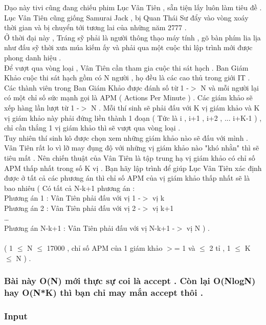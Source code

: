 



   Dạo này tivi cũng đang chiếu phim Lục Vân Tiên , sẵn tiện lấy luôn làm tiêu đề .   
\\   Lục Vân Tiên cũng giống Samurai Jack , bị Quan Thái Sư đẩy vào vòng xoáy thời gian và bị chuyển tới tương lai của những năm 2777 .   
\\   Ở thời đại này , Tráng sỹ phải là người thông thạo máy tính , gõ bàn phím lia lịa như đấu sỹ thời xưa múa kiếm ấy và phải qua một cuộc thi lập trình mới được phong danh hiệu .   
\\   Để vượt qua vòng loại , Vân Tiên cần tham gia cuộc thi sát hạch . Ban Giám Khảo cuộc thi sát hạch gồm có N người , họ đều là các cao thủ trong giới IT . Các thành viên trong Ban Giám Khảo được đánh số từ 1 -$>$ N và mỗi người lại có một chỉ số sức mạnh gọi là APM ( Actions Per Minute ) . Các giám khảo sẽ xếp hàng lần lượt từ 1 -$>$ N . Mỗi thí sinh sẽ phải đấu với K vị giám khảo và K vị giám khảo này phải đứng liền thành 1 đoạn ( Tức là i , i+1 , i+2 , ... i+K-1 ) , chỉ cần thắng 1 vị giám khảo thì sẽ vượt qua vòng loại .   
\\   Tuy nhiên thí sinh kô được chọn xem những giám khảo nào sẽ đấu với mình .   
\\   Vân Tiên rất lo vì lỡ may đụng độ với những vị giám khảo nào "khó nhằn" thì sẽ tiêu mất . Nên chiến thuật của Vân Tiên là tập trung hạ vị giám khảo có chỉ số APM thấp nhất trong số K vị . Bạn hãy lập trình để giúp Lục Vân Tiên xác định được ở tất cả các phương án thì chỉ số APM của vị giám khảo thấp nhất sẽ là bao nhiêu ( Có tất cả N-k+1 phương án :   
\\   Phương án 1 : Vân Tiên phải đấu với vị 1 -$>$ vị k   
\\   Phương án 2 : Vân Tiên phải đấu với vị 2 -$>$ vị k+1   
\\   …   
\\   Phương án N-k+1  : Vân Tiên phải đấu với vị N-k+1 -$>$ vị N ) .   
\\
\\   ( 1  $\le$  N  $\le$  17000 , chỉ số APM của 1 giám khảo $>$= 1 và  $\le$  2 tỉ , 1  $\le$  K  $\le$  N ) .  

\subsubsection{   Bài này O(N) mới thực sự coi là accept . Còn lại O(NlogN) hay O(N*K) thì bạn chỉ may mắn accept thôi .  }

\subsubsection{   Input  }

